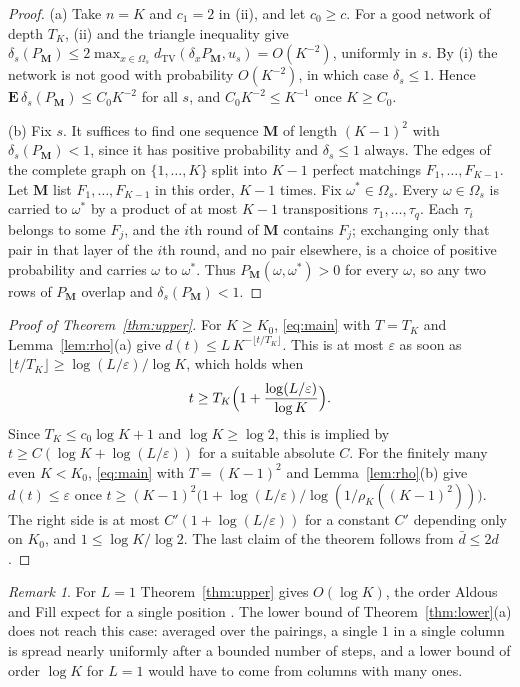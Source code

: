 \documentclass[11pt]{amsart}
\theoremstyle{remark}
\newtheorem{remark}[theorem]{Remark}
\numberwithin{equation}{section}
\newcommand{\TV}{d_{\mathrm{TV}}}
\newcommand{\E}{\mathbf E}
\begin{document}
\begin{proof}
(a) Take $n=K$ and $c_1=2$ in (ii), and let $c_0\ge c$. For a good network of depth $T_K$, (ii) and the triangle inequality give $\delta_s(P_{\mathbf M})\le2\max_{x\in\Omega_s}\TV(\delta_xP_{\mathbf M},u_s)=O(K^{-2})$, uniformly in $s$. By (i) the network is not good with probability $O(K^{-2})$, in which case $\delta_s\le1$. Hence $\E\,\delta_s(P_{\mathbf M})\le C_0K^{-2}$ for all $s$, and $C_0K^{-2}\le K^{-1}$ once $K\ge C_0$.

(b) Fix $s$. It suffices to find one sequence $\mathbf M$ of length $(K-1)^2$ with $\delta_s(P_{\mathbf M})<1$, since it has positive probability and $\delta_s\le1$ always. The edges of the complete graph on $\{1,\dots,K\}$ split into $K-1$ perfect matchings $F_1,\dots,F_{K-1}$. Let $\mathbf M$ list $F_1,\dots,F_{K-1}$ in this order, $K-1$ times. Fix $\omega^*\in\Omega_s$. Every $\omega\in\Omega_s$ is carried to $\omega^*$ by a product of at most $K-1$ transpositions $\tau_1,\dots,\tau_q$. Each $\tau_i$ belongs to some $F_j$, and the $i$th round of $\mathbf M$ contains $F_j$; exchanging only that pair in that layer of the $i$th round, and no pair elsewhere, is a choice of positive probability and carries $\omega$ to $\omega^*$. Thus $P_{\mathbf M}(\omega,\omega^*)>0$ for every $\omega$, so any two rows of $P_{\mathbf M}$ overlap and $\delta_s(P_{\mathbf M})<1$.
\end{proof}

\begin{proof}[Proof of Theorem~\ref{thm:upper}]
For $K\ge K_0$, \eqref{eq:main} with $T=T_K$ and Lemma~\ref{lem:rho}(a) give $d(t)\le L\,K^{-\lfloor t/T_K\rfloor}$. This is at most $\varepsilon$ as soon as $\lfloor t/T_K\rfloor\ge\log(L/\varepsilon)/\log K$, which holds when
\[
t\ge T_K\Bigl(1+\frac{\log(L/\varepsilon)}{\log K}\Bigr).
\] Since $T_K\le c_0\log K+1$ and $\log K\ge\log 2$, this is implied by $t\ge C(\log K+\log(L/\varepsilon))$ for a suitable absolute $C$. For the finitely many even $K<K_0$, \eqref{eq:main} with $T=(K-1)^2$ and Lemma~\ref{lem:rho}(b) give $d(t)\le\varepsilon$ once $t\ge(K-1)^2\bigl(1+\log(L/\varepsilon)/\log(1/\rho_K((K-1)^2))\bigr)$. The right side is at most $C'(1+\log(L/\varepsilon))$ for a constant $C'$ depending only on $K_0$, and $1\le\log K/\log2$. The last claim of the theorem follows from $\bar d\le2d$.
\end{proof}

\begin{remark}\label{rem:single}
For $L=1$ Theorem~\ref{thm:upper} gives $O(\log K)$, the order Aldous and Fill expect for a single position \cite{AF}. The lower bound of Theorem~\ref{thm:lower}(a) does not reach this case: averaged over the pairings, a single $1$ in a single column is spread nearly uniformly after a bounded number of steps, and a lower bound of order $\log K$ for $L=1$ would have to come from columns with many ones.
\end{remark}
\end{document}
